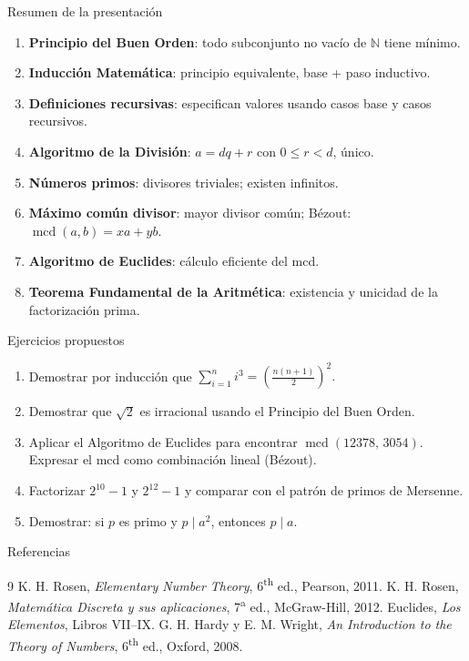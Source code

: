 \documentclass[10pt,aspectratio=169]{beamer}
\theoremstyle{definition}
\theoremstyle{plain}
\theoremstyle{remark}
\newcommand{\N}{\mathbb{N}}
\newcommand{\mcd}{\operatorname{mcd}}
\begin{document}
\begin{frame}{Resumen de la presentación}
  \begin{enumerate}
    \item \textbf{Principio del Buen Orden}: todo subconjunto no vacío de
          $\N$ tiene mínimo.
    \item \textbf{Inducción Matemática}: principio equivalente, base +
          paso inductivo.
    \item \textbf{Definiciones recursivas}: especifican valores usando
          casos base y casos recursivos.
    \item \textbf{Algoritmo de la División}: $a = dq + r$ con
          $0\le r<d$, único.
    \item \textbf{Números primos}: divisores triviales; existen
          infinitos.
    \item \textbf{Máximo común divisor}: mayor divisor común; Bézout:
          $\mcd(a,b)=xa+yb$.
    \item \textbf{Algoritmo de Euclides}: cálculo eficiente del mcd.
    \item \textbf{Teorema Fundamental de la Aritmética}: existencia y
          unicidad de la factorización prima.
  \end{enumerate}
\end{frame}

\begin{frame}{Ejercicios propuestos}
  \begin{enumerate}
    \item Demostrar por inducción que
          $\displaystyle\sum_{i=1}^{n} i^3 = \left(\frac{n(n+1)}{2}\right)^2.$
    \item Demostrar que $\sqrt{2}$ es irracional usando el Principio del
          Buen Orden.
    \item Aplicar el Algoritmo de Euclides para encontrar
          $\mcd(12378,\, 3054)$. Expresar el mcd como combinación lineal
          (Bézout).
    \item Factorizar $2^{10}-1$ y $2^{12}-1$ y comparar con el patrón
          de primos de Mersenne.
    \item Demostrar: si $p$ es primo y $p\mid a^2$, entonces $p\mid a$.
  \end{enumerate}
\end{frame}

\begin{frame}{Referencias}
  \begin{thebibliography}{9}
     K. H. Rosen, \emph{Elementary Number Theory},
      6\textsuperscript{th} ed., Pearson, 2011.
     K. H. Rosen, \emph{Matemática Discreta y sus
      aplicaciones}, 7\textsuperscript{a} ed., McGraw-Hill, 2012.
     Euclides, \emph{Los Elementos}, Libros VII--IX.
     G. H. Hardy y E. M. Wright, \emph{An
      Introduction to the Theory of Numbers}, 6\textsuperscript{th} ed.,
      Oxford, 2008.
  \end{thebibliography}
\end{frame}
\end{document}
